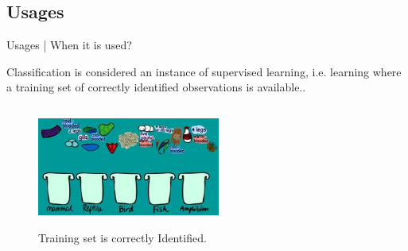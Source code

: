 \documentclass[10pt]{beamer}
\begin{document}
	\subsection{Usages}
	\begin{frame}{Usages | When it is used?}
		\begin{center}
			\large{Classification is considered an instance of supervised learning, i.e. learning where a training set of correctly identified observations is available..}\\
			\bigskip
			
			\begin{figure}
				\centering
				\includegraphics[width=60mm,height=40mm]{images/barun_2}
				\caption[]{Training set is correctly Identified.}
			\end{figure}
		\end{center}
	\end{frame}
\end{document}
